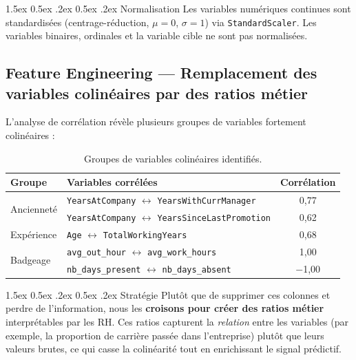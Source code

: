 \documentclass[12pt,a4paper]{article}
\makeatletter
\renewcommand\paragraph{\@startsection{paragraph}{4}{\z@}%
  {1.5ex \@plus 0.5ex \@minus .2ex}%
  {0.5ex \@plus .2ex}%
  {\normalfont\normalsize\bfseries}}
\makeatother
\begin{document}
\paragraph{Normalisation} Les variables numériques continues sont standardisées (centrage-réduction, $\mu = 0$, $\sigma = 1$) via \texttt{StandardScaler}. Les variables binaires, ordinales et la variable cible ne sont pas normalisées.

\subsection{Feature Engineering --- Remplacement des variables colinéaires par des ratios métier}

L'analyse de corrélation révèle plusieurs groupes de variables fortement colinéaires :

\begin{table}[ht]
\centering
\begin{tabular}{llc}
\toprule
\textbf{Groupe} & \textbf{Variables corrélées} & \textbf{Corrélation} \\
\midrule
\multirow{2}{*}{Ancienneté} & \texttt{YearsAtCompany} $\leftrightarrow$ \texttt{YearsWithCurrManager} & 0{,}77 \\
 & \texttt{YearsAtCompany} $\leftrightarrow$ \texttt{YearsSinceLastPromotion} & 0{,}62 \\
Expérience & \texttt{Age} $\leftrightarrow$ \texttt{TotalWorkingYears} & 0{,}68 \\
\multirow{2}{*}{Badgeage} & \texttt{avg\_out\_hour} $\leftrightarrow$ \texttt{avg\_work\_hours} & 1{,}00 \\
 & \texttt{nb\_days\_present} $\leftrightarrow$ \texttt{nb\_days\_absent} & $-$1{,}00 \\
\bottomrule
\end{tabular}
\caption{Groupes de variables colinéaires identifiés.}
\end{table}

\paragraph{Stratégie} Plutôt que de supprimer ces colonnes et perdre de l'information, nous les \textbf{croisons pour créer des ratios métier} interprétables par les RH. Ces ratios capturent la \textit{relation} entre les variables (par exemple, la proportion de carrière passée dans l'entreprise) plutôt que leurs valeurs brutes, ce qui casse la colinéarité tout en enrichissant le signal prédictif.
\end{document}
